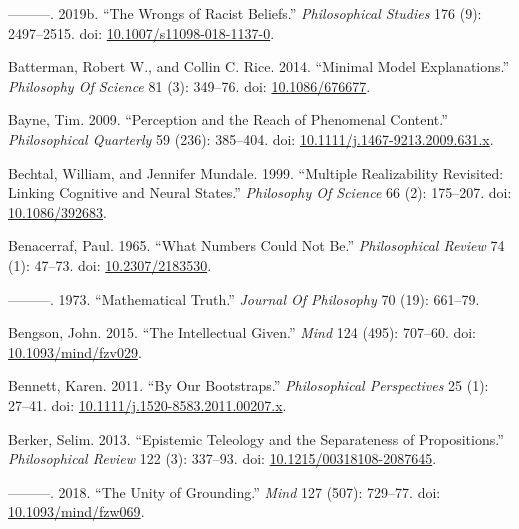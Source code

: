 \documentclass[
  10pt,
  letterpaper,
  DIV=11,
  numbers=noendperiod,
  twoside]{scrartcl}
\newlength{\cslhangindent}
\newenvironment{CSLReferences}[2] %
 {\begin{list}{}{%
  \setlength{\itemindent}{0pt}
  \setlength{\leftmargin}{0pt}
  \setlength{\parsep}{0pt}
  \ifodd #1
   \setlength{\leftmargin}{\cslhangindent}
   \setlength{\itemindent}{-1\cslhangindent}
  \fi
  \setlength{\itemsep}{#2\baselineskip}}}
 {\end{list}}
\begin{document}
\begin{CSLReferences}{1}{0}
---------. 2019b. {``The Wrongs of Racist Beliefs.''}
\emph{Philosophical Studies} 176 (9): 2497--2515. doi:
\href{https://doi.org/10.1007/s11098-018-1137-0}{10.1007/s11098-018-1137-0}.

Batterman, Robert W., and Collin C. Rice. 2014. {``Minimal Model
Explanations.''} \emph{Philosophy Of Science} 81 (3): 349--76. doi:
\href{https://doi.org/10.1086/676677}{10.1086/676677}.

Bayne, Tim. 2009. {``Perception and the Reach of Phenomenal Content.''}
\emph{Philosophical Quarterly} 59 (236): 385--404. doi:
\href{https://doi.org/10.1111/j.1467-9213.2009.631.x}{10.1111/j.1467-9213.2009.631.x}.

Bechtal, William, and Jennifer Mundale. 1999. {``Multiple Realizability
Revisited: Linking Cognitive and Neural States.''} \emph{Philosophy Of
Science} 66 (2): 175--207. doi:
\href{https://doi.org/10.1086/392683}{10.1086/392683}.

Benacerraf, Paul. 1965. {``What Numbers Could Not Be.''}
\emph{Philosophical Review} 74 (1): 47--73. doi:
\href{https://doi.org/10.2307/2183530}{10.2307/2183530}.

---------. 1973. {``Mathematical Truth.''} \emph{Journal Of Philosophy}
70 (19): 661--79.

Bengson, John. 2015. {``The Intellectual Given.''} \emph{Mind} 124
(495): 707--60. doi:
\href{https://doi.org/10.1093/mind/fzv029}{10.1093/mind/fzv029}.

Bennett, Karen. 2011. {``By Our Bootstraps.''} \emph{Philosophical
Perspectives} 25 (1): 27--41. doi:
\href{https://doi.org/10.1111/j.1520-8583.2011.00207.x}{10.1111/j.1520-8583.2011.00207.x}.

Berker, Selim. 2013. {``Epistemic Teleology and the Separateness of
Propositions.''} \emph{Philosophical Review} 122 (3): 337--93. doi:
\href{https://doi.org/10.1215/00318108-2087645}{10.1215/00318108-2087645}.

---------. 2018. {``The Unity of Grounding.''} \emph{Mind} 127 (507):
729--77. doi:
\href{https://doi.org/10.1093/mind/fzw069}{10.1093/mind/fzw069}.


\end{CSLReferences}
\end{document}
